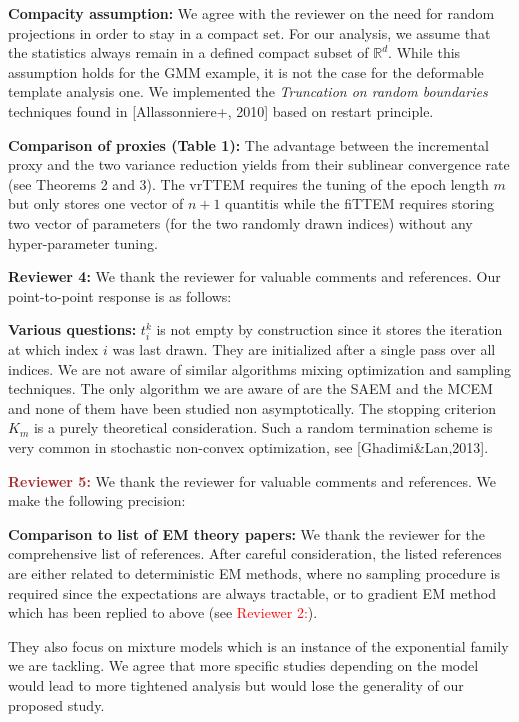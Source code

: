 \documentclass{article}
\begin{document}
\textbf{Compacity assumption:}  
We agree with the reviewer on the need for random projections in order to stay in a compact set.
For our analysis, we assume that the statistics always remain in a defined compact subset of $\mathbb{R}^d$.
While this assumption holds for the GMM example, it is not the case for the deformable template analysis one.
We implemented the \emph{Truncation on random boundaries} techniques found in [Allassonniere+, 2010] based on restart principle.

\textbf{Comparison of proxies (Table 1):} 
The advantage between the incremental proxy and the two variance reduction yields from their sublinear convergence rate (see Theorems 2 and 3).
The vrTTEM requires the tuning of the epoch length $m$ but only stores one vector of $n+1$ quantitis while the fiTTEM requires storing two vector of parameters (for the two randomly drawn indices) without any hyper-parameter tuning.

\textbf{\textcolor{yellow!50!black}{Reviewer 4:}} We thank the reviewer for valuable comments and references. Our point-to-point response is as follows:

\textbf{Various questions:} $t_i^k$ is not empty by construction since it stores the iteration at which index $i$ was last drawn. 
They are initialized after a single pass over all indices.
We are not aware of similar algorithms mixing optimization and sampling techniques. The only algorithm we are aware of are the SAEM and the MCEM and none of them have been studied non asymptotically.
The stopping criterion $K_m$ is a purely theoretical consideration. Such a random termination scheme is very common in stochastic non-convex optimization, see [Ghadimi\&Lan,2013]. 



\textbf{\textcolor{brown}{Reviewer 5:}} We thank the reviewer for valuable comments and references. We make the following precision:

\textbf{Comparison to list of EM theory papers:}
We thank the reviewer for the comprehensive list of references.
After careful consideration, the listed references are either related to deterministic EM methods, where no sampling procedure is required since the expectations are always tractable, or to gradient EM method which has been replied to above (see \textcolor{red}{Reviewer 2:}).

They also focus on mixture models which is an instance of the exponential family we are tackling.
We agree that more specific studies depending on the model would lead to more tightened analysis but would lose the generality of our proposed study.
\end{document}
